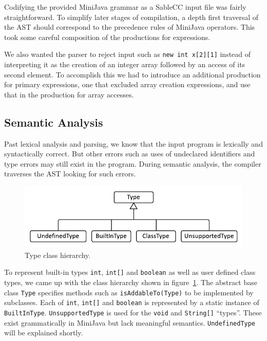 \documentclass[a4paper,11pt]{article}
\begin{document}
Codifying the provided MiniJava grammar as a SableCC input file was fairly
straightforward. To simplify later stages of compilation, a depth first traversal
of the AST should correspond to the precedence rules of MiniJava operators. This
took some careful composition of the productions for expressions.

We also wanted the parser to reject input such as \lstinline{new int x[2][1]}
instead of interpreting it as the creation of an integer array followed by an
access of its second element. To accomplish this we had to introduce an additional
production for primary expressions, one that excluded array creation expressions,
and use that in the production for array accesses.

\subsection{Semantic Analysis}

Past lexical analysis and parsing, we know that the input program is lexically and
syntactically correct. But other errors such as uses of undeclared identifiers
and type errors may still exist in the program. During semantic analysis, the
compiler traverses the AST looking for such errors.

\begin{figure}[h!]
    \centering
    \includegraphics[scale=0.9]{figures/type_classes.pdf}
    \caption{Type class hierarchy.}
    \label{fig:type_classes}
\end{figure}

To represent built-in types \texttt{int}, \texttt{int[]} and \texttt{boolean} as
well as user defined class types, we came up with the class hierarchy shown in
figure~\ref{fig:type_classes}. The abstract base class \texttt{Type} specifies
methods such as \texttt{isAddableTo(Type)} to be implemented by subclasses. Each
of \texttt{int}, \texttt{int[]} and \texttt{boolean} is represented by a static
instance of \texttt{BuiltInType}. \texttt{UnsupportedType} is used for the
\texttt{void} and \texttt{String[]} ``types''. These exist grammatically in
MiniJava but lack meaningful semantics. \texttt{UndefinedType} will be explained
shortly.
\end{document}
